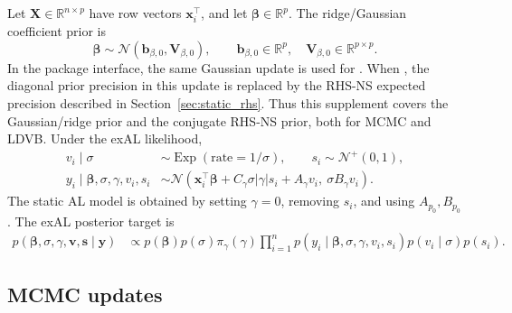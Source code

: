 \documentclass[nojss,noheadings]{jss}
\newcommand{\R}{\mathbb{R}}
\newcommand{\vect}[1]{\bm{#1}}
\newcommand{\mat}[1]{\mathbf{#1}}
\newcommand{\N}{\mathcal{N}}
\newcommand{\TNp}{\mathcal{N}^{+}}
\newcommand{\Exp}{\operatorname{Exp}}
\newcommand{\pigamma}{\pi_\gamma}
\begin{document}
Let $\mat{X}\in\R^{n\times p}$ have row vectors $\vect{x}_i^\top$, and let
$\vect{\beta}\in\R^p$. The ridge/Gaussian coefficient prior is
\begin{equation}
\vect{\beta}\sim\N(\vect{b}_{\beta,0},\mat{V}_{\beta,0}),\qquad
\vect{b}_{\beta,0}\in\R^p,\quad \mat{V}_{\beta,0}\in\R^{p\times p}.
\label{eq:static_beta_ridge}
\end{equation}
In the package interface, the same Gaussian update is used for
. When , the diagonal
prior precision in this update is replaced by the RHS-NS expected precision
described in Section~\ref{sec:static_rhs}. Thus this supplement covers the
Gaussian/ridge prior and the conjugate RHS-NS prior, both for MCMC and LDVB.
Under the exAL likelihood,
\begin{align}
v_i\mid\sigma &\sim \Exp(\text{rate}=1/\sigma),\qquad
s_i\sim\TNp(0,1),\\
y_i\mid\vect{\beta},\sigma,\gamma,v_i,s_i
&\sim
\N\left(
\vect{x}_i^\top\vect{\beta}+C_\gamma\sigma|\gamma|s_i+A_\gamma v_i,\
\sigma B_\gamma v_i
\right).
\label{eq:static_exal_hierarchy}
\end{align}
The static AL model is obtained by setting $\gamma=0$, removing $s_i$, and
using $A_{p_0},B_{p_0}$. The exAL posterior target is
\begin{align}
p(\vect{\beta},\sigma,\gamma,\vect{v},\vect{s}\mid\vect{y})
&\propto
p(\vect{\beta})p(\sigma)\pigamma(\gamma)
\prod_{i=1}^n
p(y_i\mid\vect{\beta},\sigma,\gamma,v_i,s_i)
p(v_i\mid\sigma)p(s_i).
\label{eq:static_exal_target}
\end{align}

\subsection{MCMC updates}
\end{document}
